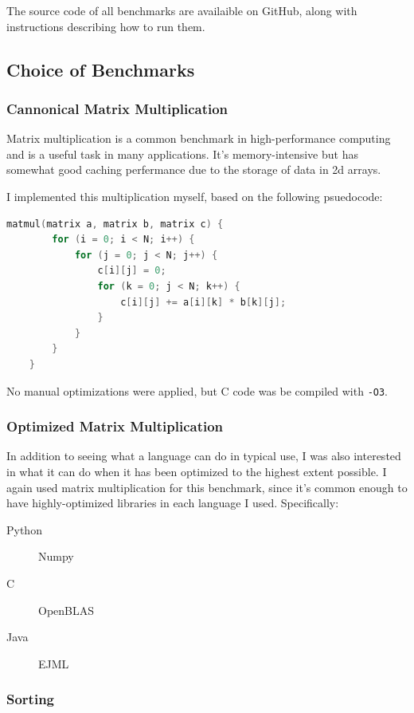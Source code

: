 \documentclass[12pt,letterpaper]{article}
\begin{document}
The source code of all benchmarks are availaible on GitHub, along with
instructions describing how to run them.

\subsection{Choice of Benchmarks}

\subsubsection{Cannonical Matrix Multiplication}

Matrix multiplication is a common benchmark in high-performance computing and is
a useful task in many applications. It's memory-intensive but has somewhat good
caching perfermance due to the storage of data in 2d arrays.

I implemented this multiplication myself, based on the following psuedocode:

\begin{lstlisting}[language=c]
	matmul(matrix a, matrix b, matrix c) {
		for (i = 0; i < N; i++) {
			for (j = 0; j < N; j++) {
				c[i][j] = 0;
				for (k = 0; j < N; k++) {
					c[i][j] += a[i][k] * b[k][j];
				}
			}
		}
	}
\end{lstlisting}

No manual optimizations were applied, but C code was be compiled with
\texttt{-O3}.

\subsubsection{Optimized Matrix Multiplication}

In addition to seeing what a language can do in typical use, I was also
interested in what it can do when it has been optimized to the highest extent
possible. I again used matrix multiplication for this benchmark, since it's
common enough to have highly-optimized libraries in each language I used.
Specifically:

\begin{description}
	\item [Python] Numpy
	\item [C] OpenBLAS
	\item [Java] EJML
\end{description}

\subsubsection{Sorting}
\end{document}
